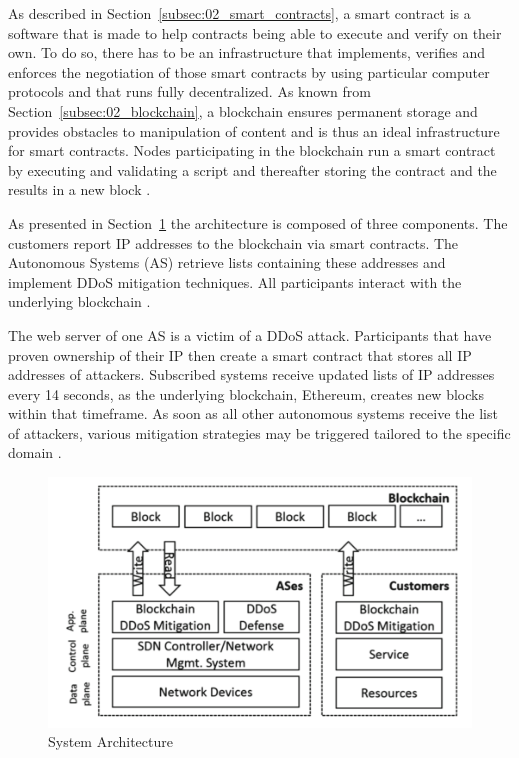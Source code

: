 As described in Section~\ref{subsec:02_smart_contracts}, a smart contract is a software that is made to help contracts being able to execute and verify on their own. To do so, there has to be an infrastructure that implements, verifies and enforces the negotiation of those smart contracts by using particular computer protocols and that runs fully decentralized. As known from Section~\ref{subsec:02_blockchain}, a blockchain ensures permanent storage and provides obstacles to manipulation of content and is thus an ideal infrastructure for smart contracts. Nodes participating in the blockchain run a smart contract by executing and validating a script and thereafter storing the contract and the results in a new block \cite{Rodrigues2017}.

As presented in Section~\ref{system_architecture} the architecture is composed of three components. The customers report IP addresses to the blockchain via smart contracts. The Autonomous Systems (AS) retrieve lists containing these addresses and implement DDoS mitigation techniques. All participants interact with the underlying blockchain \cite{Rodrigues2017}.

The web server of one AS is a victim of a DDoS attack. Participants that have proven ownership of their IP then create a smart contract that stores all IP addresses of attackers. Subscribed systems receive updated lists of IP addresses every 14 seconds, as the underlying blockchain, Ethereum, creates new blocks within that timeframe. As soon as all other autonomous systems receive the list of attackers, various mitigation strategies may be triggered tailored to the specific domain \cite{Rodrigues2017}.
\begin{figure}[ht]
  \begin{center}
    \includegraphics[scale=0.6]{Talk7/img/ddos/collaborative_ddos_mitigation_system_architecture}
  \end{center}
  \caption{System Architecture}
  \label{system_architecture}
\end{figure}

